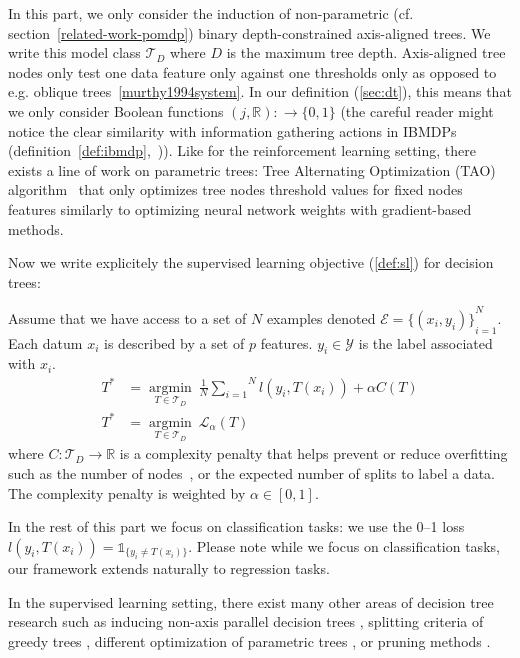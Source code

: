 In this part, we only consider the induction of non-parametric (cf. section~\ref{related-work-pomdp}) binary depth-constrained axis-aligned trees. 
We write this model class $\mathcal{T}_D$ where $D$ is the maximum tree depth.
Axis-aligned tree nodes only test one data feature only against one thresholds only as opposed to e.g. oblique trees~\ref{murthy1994system}.
In our definition (\ref{sec:dt}), this means that we only consider Boolean functions $(j, \mathbb{R}):\rightarrow \{0, 1\}$ (the careful reader might notice the clear similarity with information gathering actions in IBMDPs (definition~\ref{def:ibmdp},~\cite{topin2021iterative})).
Like for the reinforcement learning setting, there exists a line of work on parametric trees: Tree Alternating Optimization (TAO) algorithm~\cite{NEURIPS2018_185c29dc,9534446,10.1145/3412815.3416882} that only optimizes tree nodes threshold values for fixed nodes features similarly to optimizing neural network weights with gradient-based methods. 

Now we write explicitely the supervised learning objective (\ref{def:sl}) for decision trees:

\begin{definition}\label{eq:suplearning}
    Assume that we have access to a set of $N$ examples denoted $\mathcal{E} = {\{(x_i, y_i)\}}_{i=1}^N$. Each datum $x_i$ is described by a set of $p$ features. $y_i \in {\mathcal Y}$ is the label associated with $x_i$.
    \begin{align*}
    T^* &= \underset{T \in \mathcal{T}_D}{\operatorname{argmin}}\ \frac{1}{N}\overset{N}{\underset{i=1}{\sum}}{l}(y_i, T(x_i)) + \alpha C(T) \\
    T^* &= \underset{T \in \mathcal{T}_D}{\operatorname{argmin}}\ {\mathcal L}_\alpha(T)
\end{align*}
where $C: \mathcal{T}_D \rightarrow \mathbb{R}$ is a complexity penalty that helps prevent or reduce overfitting such as the number of nodes~\cite{breiman1984classification,quantbnb}, or the expected number of splits to label a data\cite{how-eff}. The complexity penalty is weighted by $\alpha \in [0, 1]$. %
\end{definition}

In the rest of this part we focus on classification tasks: we use the 0--1 loss $l(y_i, T(x_i)) = \mathds{1}_{\{y_i\neq T(x_i)\}}$.
Please note while we focus on classification tasks, our framework extends naturally to regression tasks.

In the supervised learning setting, there exist many other areas of decision tree research \cite{loh2014fifty} such as inducing non-axis parallel decision trees \cite{murthy1994system,10.1145/3637528.3671903}, splitting criteria of greedy trees \cite{vanderlinden2024optimalgreedydecisiontrees}, different optimization of parametric trees \cite{NIPS2015_1579779b,10.5555/3327757.3327770}, or pruning methods \cite{pruning1,pruning2}. 